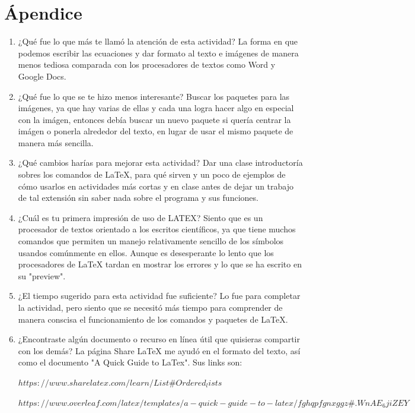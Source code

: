 \documentclass{article} %
\begin{document}
\section{Ápendice}
\begin{enumerate}
\item ¿Qué fue lo que más te llamó la atención de esta actividad?
La forma en que podemos escribir las ecuaciones y dar formato al texto e imágenes de manera menos tediosa comparada con los procesadores de textos como Word y Google Docs.

\item ¿Qué fue lo que se te hizo menos interesante?
Buscar los paquetes para las imágenes, ya que hay varias de ellas y cada una logra hacer algo en especial con la imágen, entonces debía buscar un nuevo paquete si quería centrar la imágen o ponerla alrededor del texto, en lugar de usar el mismo paquete de manera más sencilla.

\item ¿Qué cambios harías para mejorar esta actividad? Dar una clase introductoría sobres los comandos de LaTeX, para qué sirven y un poco de ejemplos de cómo usarlos en actividades más cortas y en clase antes de dejar un trabajo de tal extensión sin saber nada sobre el programa y sus funciones.

\item ¿Cuál es tu primera impresión de uso de LATEX? Siento que es un procesador de textos orientado a los escritos científicos, ya que tiene muchos comandos que permiten un manejo relativamente sencillo de los símbolos usandos comúnmente en ellos. Aunque es desesperante lo lento que los procesadores de LaTeX tardan en mostrar los errores y lo que se ha escrito en su "preview".

\item ¿El tiempo sugerido para esta actividad fue suficiente? Lo fue para completar la actividad, pero siento que se necesitó más tiempo para comprender de manera conscisa el funcionamiento de los comandos y paquetes de LaTeX.

\item ¿Encontraste algún documento o recurso en línea útil que quisieras compartir con los demás?  La página Share LaTeX me ayudó en el formato del texto, así como el documento "A Quick Guide to LaTex". Sus links son:

$https://www.sharelatex.com/learn/List \# Ordered_lists$

$https://www.overleaf.com/latex/templates/a-quick-guide-to-latex/fghqpfgnxggz \# .WnAE_6jiZEY$
\end{enumerate} 
\end{document}

